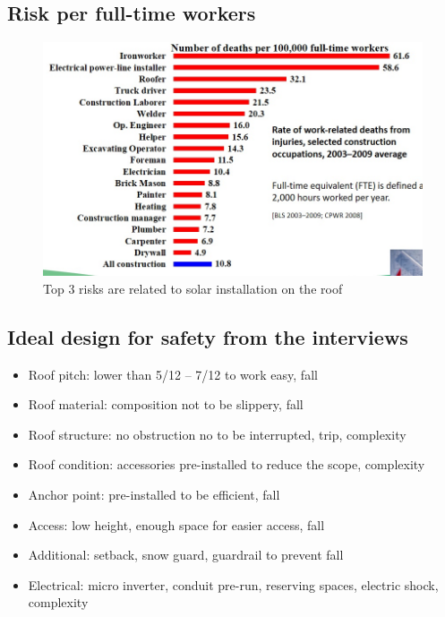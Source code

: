 \documentclass[]{article}
\providecommand{\tightlist}{%
  \setlength{\itemsep}{0pt}\setlength{\parskip}{0pt}}
\begin{document}
\subsection{Risk per full-time
workers}\label{risk-per-full-time-workers}

\begin{figure}
\centering
\includegraphics{./Figs/PTD.jpg}
\caption{Top 3 risks are related to solar installation on the roof}
\end{figure}

\subsection{Ideal design for safety from the
interviews}\label{ideal-design-for-safety-from-the-interviews}

\begin{itemize}
\tightlist
\item
  Roof pitch: lower than 5/12 -- 7/12 to work easy, fall
\item
  Roof material: composition not to be slippery, fall
\item
  Roof structure: no obstruction no to be interrupted, trip, complexity
\item
  Roof condition: accessories pre-installed to reduce the scope,
  complexity
\item
  Anchor point: pre-installed to be efficient, fall
\item
  Access: low height, enough space for easier access, fall
\item
  Additional: setback, snow guard, guardrail to prevent fall
\item
  Electrical: micro inverter, conduit pre-run, reserving spaces,
  electric shock, complexity
\end{itemize}
\end{document}

